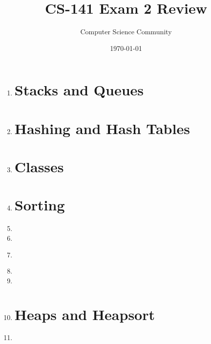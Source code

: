 \documentclass[11pt]{article}
\title{CS-141 Exam 2 Review}
\author{Computer Science Community}
\date{\today}
\begin{document}
\header

\begin{enumerate}

\section*{Linked Lists}
    \item 

\pagebreak
\section*{Stacks and Queues}
	\item 

\pagebreak
\section*{Hashing and Hash Tables}
	\item 

\section*{Classes}
	\item 

\newpage
\section*{Sorting}
	\item 

	\item 

	\item \label{qsort-worst-case} 

	\item 

	\item 
      
\newpage
	\item 

\section*{Heaps and Heapsort}
	\item 


\end{enumerate}
\end{document}
